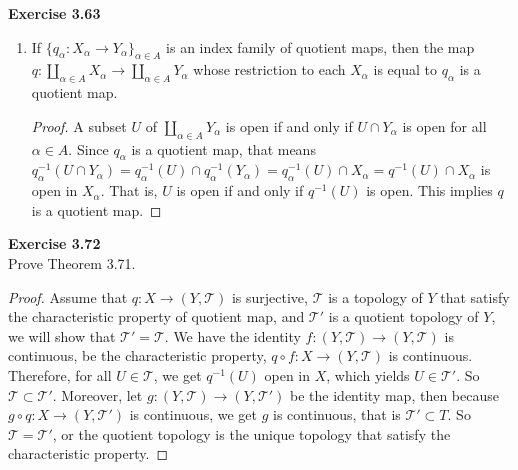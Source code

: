 \documentclass[12pt, a4paper]{article}
\theoremstyle{plain}
\newcommand{\T}{\mathcal{T}}
\newenvironment{exercise}[2][Exercise]
    { \begin{mdframed}[backgroundcolor=gray!20] \textbf{#1 #2} \\}
    {  \end{mdframed}}
\begin{document}
\begin{exercise}{3.63}
\begin{enumerate}[label=(\alph*)]
\item If $\{q_\alpha:X_\alpha\rightarrow Y_\alpha\}_{\alpha\in A}$ is an index family of quotient maps, then the map $q:\coprod_{\alpha\in A}X_\alpha\rightarrow \coprod_{\alpha\in A}Y_\alpha$ whose restriction to each $X_\alpha$ is equal to $q_\alpha$ is a quotient map.
	\begin{proof}
	A subset $U$ of $\coprod_{\alpha\in A}Y_\alpha$ is open if and only if $U\cap Y_\alpha$ is open for all $\alpha\in A$. Since $q_\alpha$ is a quotient map, that means $q_\alpha^{-1}(U\cap Y_\alpha)=q_\alpha^{-1}(U)\cap q_\alpha^{-1}(Y_\alpha)=q_\alpha^{-1}(U)\cap X_\alpha = q^{-1}(U)\cap X_\alpha$ is open in $X_\alpha$. That is, $U$ is open if and only if $q^{-1}(U)$ is open. This implies $q$ is a quotient map.
	\end{proof}
\end{enumerate}
\end{exercise}

\begin{exercise}{3.72}
Prove Theorem 3.71.
\end{exercise}
	\begin{proof}
	Assume that $q:X\rightarrow (Y, \T)$ is surjective, $\T$ is a topology of $Y$ that satisfy the characteristic property of quotient map, and $\T'$ is a quotient topology of $Y$, we will show that $\T'=\T$. We have the identity $f:(Y,\T)\rightarrow (Y,\T)$ is continuous, be the characteristic property, $q\circ f: X\rightarrow (Y,\T)$ is continuous. Therefore, for all $U\in \T$, we get $q^{-1}(U)$ open in $X$, which yields $U\in \T'$. So $\T\subset \T'$. Moreover, let $g:(Y,\T)\rightarrow (Y,\T')$ be the identity map, then because $g\circ q:X\rightarrow (Y,\T')$ is continuous, we get $g$ is continuous, that is $\T'\subset T$. So $\T=\T'$, or the quotient topology is the unique topology that satisfy the characteristic property.
	\end{proof}

\pagebreak
\end{document}
